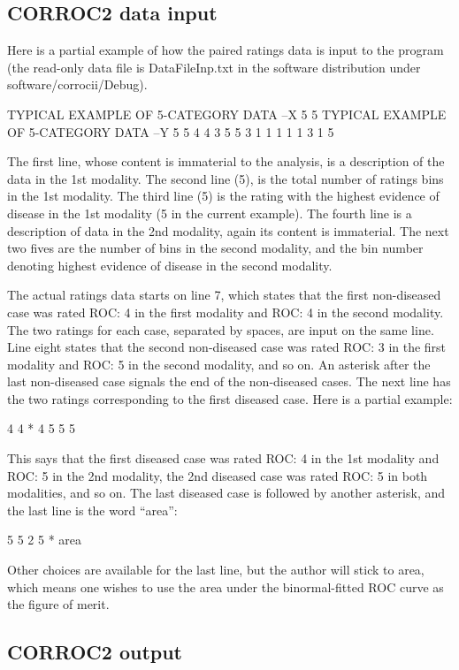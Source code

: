 \documentclass[
]{book}
\begin{document}
\hypertarget{bivariate-binormal-model-corroc2-data-input}{%
\subsection{CORROC2 data input}\label{bivariate-binormal-model-corroc2-data-input}}

Here is a partial example of how the paired ratings data is input to the program (the read-only data file is DataFileInp.txt in the software distribution under software/corrocii/Debug).

TYPICAL EXAMPLE OF 5-CATEGORY DATA --X
5
5
TYPICAL EXAMPLE OF 5-CATEGORY DATA --Y
5
5
4 4
3 5
5 3
1 1
1 1
1 3
1 5

The first line, whose content is immaterial to the analysis, is a description of the data in the 1st modality. The second line (5), is the total number of ratings bins in the 1st modality. The third line (5) is the rating with the highest evidence of disease in the 1st modality (5 in the current example). The fourth line is a description of data in the 2nd modality, again its content is immaterial. The next two fives are the number of bins in the second modality, and the bin number denoting highest evidence of disease in the second modality.

The actual ratings data starts on line 7, which states that the first non-diseased case was rated ROC: 4 in the first modality and ROC: 4 in the second modality. The two ratings for each case, separated by spaces, are input on the same line. Line eight states that the second non-diseased case was rated ROC: 3 in the first modality and ROC: 5 in the second modality, and so on. An asterisk after the last non-diseased case signals the end of the non-diseased cases. The next line has the two ratings corresponding to the first diseased case. Here is a partial example:

4 4
*
4 5
5 5

This says that the first diseased case was rated ROC: 4 in the 1st modality and ROC: 5 in the 2nd modality, the 2nd diseased case was rated ROC: 5 in both modalities, and so on. The last diseased case is followed by another asterisk, and the last line is the word ``area'':

5 5
2 5
*
area

Other choices are available for the last line, but the author will stick to area, which means one wishes to use the area under the binormal-fitted ROC curve as the figure of merit.

\hypertarget{bivariate-binormal-model-corroc2-output}{%
\subsection{CORROC2 output}\label{bivariate-binormal-model-corroc2-output}}
\end{document}

